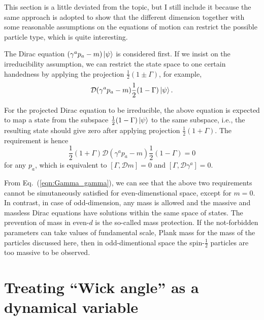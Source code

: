 \documentclass[%
 reprint,
groupedaddress,
showpacs,
 amsmath,amssymb,
 aps,
prb,
]{revtex4-1}
\begin{document}
This section is a little deviated from the topic, but I still include it because the same approach is adopted to show that the different dimension together with some reasonable assumptions on the equations of motion can restrict the possible particle type, which is quite interesting.

The Dirac equation $ (\gamma^a p_a - m)\ket{\psi} $ is considered first. If we insist on the irreducibility assumption, we can restrict the state space to one certain handedness by applying the projection $ \frac{1}{2}(1\pm \Gamma) $, for example,
\begin{equation}
 \mathcal D (\gamma^a p_a - m ) \frac{1}{2} (1- \Gamma) \ket{\psi}.
\end{equation}

For the projected Dirac equation to be irreducible, the above equation is expected to map a state from the subspace $\frac{1}{2} (1- \Gamma) \ket{\psi}$ to the same subspace, i.e., the resulting state should give zero after applying projection $ \frac{1}{2}(1+ \Gamma) $. The requirement is hence
\begin{equation}
\frac{1}{2}(1+ \Gamma)\mathcal D (\gamma^a p_a - m ) \frac{1}{2} (1- \Gamma) = 0
\end{equation}
for any $ p_a $, which is equivalent to $ [\Gamma, \mathcal D m ] =0$ and $ [\Gamma, \mathcal D \gamma^a]=0 $.

From Eq.~(\ref{eqn:Gamma_gamma}), we can see that the above two requirements cannot be simutaneously satisfied for even-dimenstional space, except for $m=0$. In contrast, in case of odd-dimension, any mass is allowed and the massive and massless Dirac equations have solutions within the same space of states. The prevention of mass in even-$d$ is the so-called mass protection. If the not-forbidden parameters can take values of fundamental scale, Plank mass for the mass of the particles discussed here, then in odd-dimentional space the spin-$\frac{1}{2} $ particles are too massive to be observed.







\section{Treating ``Wick angle'' as a dynamical variable} %
\label{sec:treating_}
\end{document}
